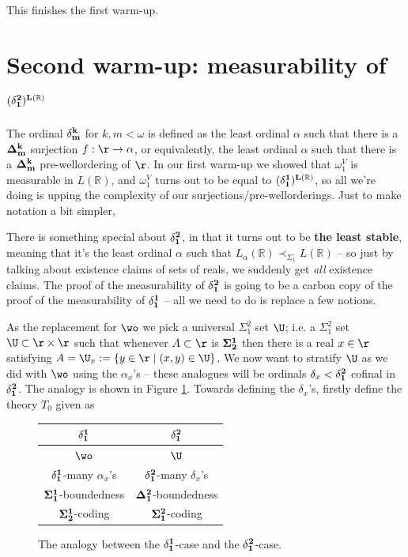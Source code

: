 This finishes the first warm-up.

\pagebreak
\section{Second warm-up: measurability of $(\bf\delta^2_1)^{L(\mathbb R)}$}

The ordinal $\bf\delta^k_m$ for $k,m<\omega$ is defined as the least ordinal $\alpha$ such that there is a $\bf\Delta^k_m$ surjection $f:\r\to\alpha$, or equivalently, the least ordinal $\alpha$ such that there is a $\bf\Delta^k_m$ pre-wellordering of $\r$. In our first warm-up we showed that $\omega_1^V$ is measurable in $L(\mathbb R)$, and $\omega_1^V$ turns out to be equal to $(\bf\delta^1_1)^{L(\mathbb R)}$, so all we're doing is upping the complexity of our surjections/pre-wellorderings. Just to make notation a bit simpler,

\begin{center}
\end{center}

There is something special about $\bf\delta^2_1$, in that it turns out to be \textbf{the least stable}, meaning that it's the least ordinal $\alpha$ such that $L_\alpha(\mathbb R)\prec_{\Sigma_1}L(\mathbb R)$ -- so just by talking about existence claims of sets of reals, we suddenly get \textit{all} existence claims. The proof of the measurability of $\bf\delta^2_1$ is going to be a carbon copy of the proof of the measurability of $\bf\delta^1_1$ -- all we need to do is replace a few notions. 

\qquad As the replacement for $\wo$ we pick a universal $\Sigma^2_1$ set $\U$; i.e. a $\Sigma^2_1$ set $\U\subset\r\times\r$ such that whenever $A\subset\r$ is $\bf\Sigma^1_2$ then there is a real $x\in\r$ satisfying $A=\U_x:=\{y\in\r\mid (x,y)\in\U\}$. We now want to stratify $\U$ as we did with $\wo$ using the $\alpha_x$'s -- these analogues will be ordinals $\delta_x<\bf\delta^2_1$ cofinal in $\bf\delta^2_1$. The analogy is shown in Figure \ref{fig.analogy}. Towards defining the $\delta_x$'s, firstly define the theory $T_0$ given as

\renewcommand{\arraystretch}{1.5}
\begin{figure}
	\label{fig.analogy}
\begin{center}
	\begin{tabular}{c | c}
		\hline$\bf\delta^1_1$ & $\bf\delta^2_1$\\[3pt]\hline
	$\wo$ & $\U$\\
	$\bf\delta^1_1$-many $\alpha_x$'s & $\bf\delta^2_1$-many $\delta_x$'s\\
	$\bf\Sigma^1_1$-boundedness & $\bf\Delta^2_1$-boundedness\\
	$\bf\Sigma^1_2$-coding & $\bf\Sigma^2_1$-coding\\\hline
\end{tabular}
\end{center}
\caption{The analogy between the $\bf\delta^1_1$-case and the $\bf\delta^2_1$-case.}
\end{figure}


